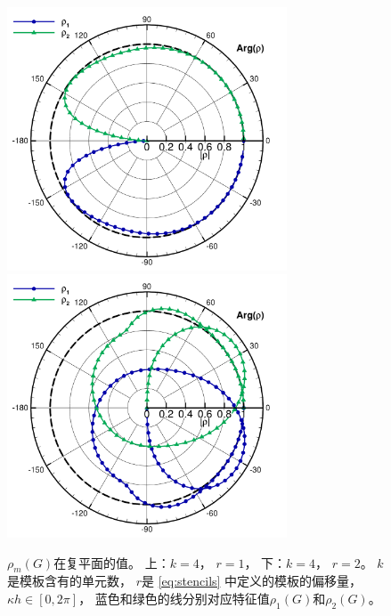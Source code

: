\begin{figure}[htbp]
  \centering
  \includegraphics[width=0.74\textwidth]{fig/1D/pol81.pdf}
  \includegraphics[width=0.74\textwidth]{fig/1D/pol82.pdf}
  \caption{$\rho_m(G)$在复平面的值。
    上：$k=4$，
    $r=1$，
    下：$k=4$，
    $r=2$。
    $k$是模板含有的单元数，
    $r$是 \cref{eq:stencils} 中定义的模板的偏移量，
    $\kappa h\in [0,2\pi]$，
    蓝色和绿色的线分别对应特征值$\rho_1(G)$和$\rho_2(G)$。
  }
  \label{fig:eigens-4}
\end{figure}

